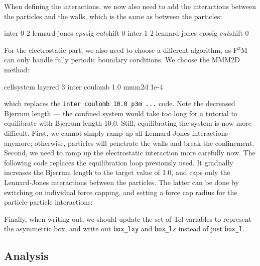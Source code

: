 \documentclass[
a4paper,                        %
11pt,                           %
twoside,                        %
footsepline,                    %
headsepline,                    %
headexclude,                    %
footexclude,                    %
pagesize,                       %
]{scrartcl}
\begin{document}
When defining the interactions, we now also need to add the
interactions between the particles and the walls, which is the same as
between the particles:

\begin{tclcode}
  inter 0 2 lennard-jones $eps $sig $cut $shift 0
  inter 1 2 lennard-jones $eps $sig $cut $shift 0
\end{tclcode}

For the electrostatic part, we also need to choose a different algorithm,
as P$^3$M can only handle fully periodic boundary conditions. We
choose the MMM2D method:

\begin{tclcode}
  cellsystem layered 3
  inter coulomb 1.0 mmm2d 1e-4  
\end{tclcode}

which replaces the \verb|inter coulomb 10.0 p3m ...| code. Note the
decreased Bjerrum length --- the confined system would take too long for
a tutorial to equilibrate with Bjerrum length 10.0. Still,
equilibrating the system is now more difficult. First, we cannot
simply ramp up all Lennard-Jones interactions anymore; otherwise,
particles will penetrate the walls and break the confinement. Second,
we need to ramp up the electrostatic interaction more carefully
now. The following code replaces the equilibration loop previously 
used. It gradually increases the Bjerrum length to the
target value of 1.0, and caps only the Lennard-Jones interactions
between the particles. The latter can be done by switching on
individual force capping, and setting a force cap radius for the
particle-particle interactions:


Finally, when writing out, we should update the set of
Tcl-variables to represent the asymmetric box, and write out
\verb|box_lxy| and \verb|box_lz| instead of just \verb|box_l|.

\subsection*{Analysis}
\end{document}
